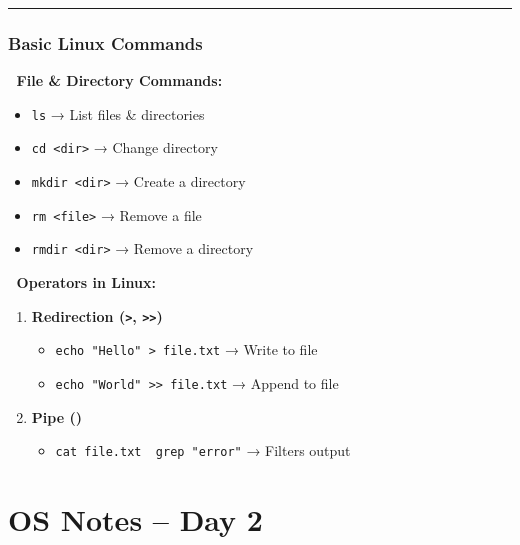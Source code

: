 \documentclass[
]{article}
\providecommand{\tightlist}{%
  \setlength{\itemsep}{0pt}\setlength{\parskip}{0pt}}
\begin{document}
\begin{center}\rule{0.5\linewidth}{0.5pt}\end{center}

\subsubsection{\texorpdfstring{\textbf{Basic Linux
Commands}}{Basic Linux Commands}}\label{basic-linux-commands}

📌 \textbf{File \& Directory Commands:}

\begin{itemize}
\tightlist
\item
  \texttt{ls} → List files \& directories
\item
  \texttt{cd\ \textless{}dir\textgreater{}} → Change directory
\item
  \texttt{mkdir\ \textless{}dir\textgreater{}} → Create a directory
\item
  \texttt{rm\ \textless{}file\textgreater{}} → Remove a file
\item
  \texttt{rmdir\ \textless{}dir\textgreater{}} → Remove a directory
\end{itemize}

📌 \textbf{Operators in Linux:}

\begin{enumerate}
\def\labelenumi{\arabic{enumi}.}
\item
  \textbf{Redirection (\texttt{\textgreater{}},
  \texttt{\textgreater{}\textgreater{}})}

  \begin{itemize}
  \tightlist
  \item
    \texttt{echo\ "Hello"\ \textgreater{}\ file.txt} → Write to file
  \item
    \texttt{echo\ "World"\ \textgreater{}\textgreater{}\ file.txt} →
    Append to file
  \end{itemize}
\item
  \textbf{Pipe (\texttt{\textbar{}})}

  \begin{itemize}
  \tightlist
  \item
    \texttt{cat\ file.txt\ \textbar{}\ grep\ "error"} → Filters output
  \end{itemize}
\end{enumerate}

\section{\texorpdfstring{\textbf{OS Notes -- Day
2}}{OS Notes -- Day 2}}\label{os-notes-day-2}
\end{document}
